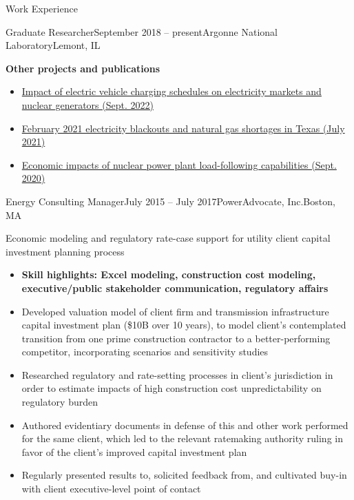 \documentclass{resume} %
\begin{document}
\begin{rSection}{Work Experience}
\begin{rSubsection}{Graduate Researcher}{September 2018 -- present}{Argonne National Laboratory}{Lemont, IL}
  \item \textbf{Other projects and publications}
  \begin{itemize}
    \item \href{https://www.osti.gov/biblio/1891624}{Impact of electric vehicle charging schedules on electricity markets and nuclear generators (Sept. 2022)}
    \item \href{https://www.osti.gov/biblio/1822217}{February 2021 electricity blackouts and natural gas shortages in Texas (July 2021)}
    \item \href{https://www.osti.gov/biblio/1701718}{Economic impacts of nuclear power plant load-following capabilities (Sept. 2020)}
  \end{itemize}

\end{rSubsection}


\begin{rSubsection}{Energy Consulting Manager}{July 2015 -- July 2017}{PowerAdvocate, Inc.}{Boston, MA}
  \setlength{\itemsep}{-3pt}
  \item Economic modeling and regulatory rate-case support for utility client capital investment planning process
  \begin{itemize}
    \item \textbf{Skill highlights: Excel modeling, construction cost modeling, executive/public stakeholder communication, regulatory affairs}
    \item Developed valuation model of client firm and transmission infrastructure capital investment plan (\$10B over 10 years), to model client's contemplated transition from one prime construction contractor to a better-performing competitor, incorporating scenarios and sensitivity studies
    \item Researched regulatory and rate-setting processes in client's jurisdiction in order to estimate impacts of high construction cost unpredictability on regulatory burden
    \item Authored evidentiary documents in defense of this and other work performed for the same client, which led to the relevant ratemaking authority ruling in favor of the client's improved capital investment plan
    \item Regularly presented results to, solicited feedback from, and cultivated buy-in with client executive-level point of contact
  \end{itemize}
\end{rSubsection}


\end{rSection}
\end{document}
